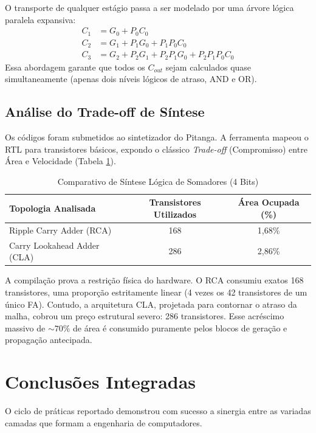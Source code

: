 \documentclass[conference]{IEEEtran}
\begin{document}
O transporte de qualquer estágio passa a ser modelado por uma árvore lógica paralela expansiva:
\begin{align}
C_1 &= G_0 + P_0 C_0 \\
C_2 &= G_1 + P_1 G_0 + P_1 P_0 C_0 \\
C_3 &= G_2 + P_2 G_1 + P_2 P_1 G_0 + P_2 P_1 P_0 C_0
\end{align}
Essa abordagem garante que todos os $C_{out}$ sejam calculados quase simultaneamente (apenas dois níveis lógicos de atraso, AND e OR).

\subsection{Análise do Trade-off de Síntese}
Os códigos foram submetidos ao sintetizador do Pitanga. A ferramenta mapeou o RTL para transistores básicos, expondo o clássico \textit{Trade-off} (Compromisso) entre Área e Velocidade (Tabela \ref{tab1}).

\begin{table}[H]
\caption{Comparativo de Síntese Lógica de Somadores (4 Bits)}
\begin{center}
\begin{tabular}{@{}lcc@{}}
\toprule
\textbf{Topologia Analisada} & \textbf{Transistores Utilizados} & \textbf{Área Ocupada (\%)} \\
\midrule
Ripple Carry Adder (RCA)      & 168                              & 1,68\%                     \\
Carry Lookahead Adder (CLA)   & 286                              & 2,86\%                     \\
\bottomrule
\end{tabular}
\label{tab1}
\end{center}
\end{table}

A compilação prova a restrição física do hardware. O RCA consumiu exatos 168 transistores, uma proporção estritamente linear (4 vezes os 42 transistores de um único FA). Contudo, a arquitetura CLA, projetada para contornar o atraso da malha, cobrou um preço estrutural severo: 286 transistores. Esse acréscimo massivo de $\sim 70\%$ de área é consumido puramente pelos blocos de geração e propagação antecipada.

\section{Conclusões Integradas}
O ciclo de práticas reportado demonstrou com sucesso a sinergia entre as variadas camadas que formam a engenharia de computadores.
\end{document}
